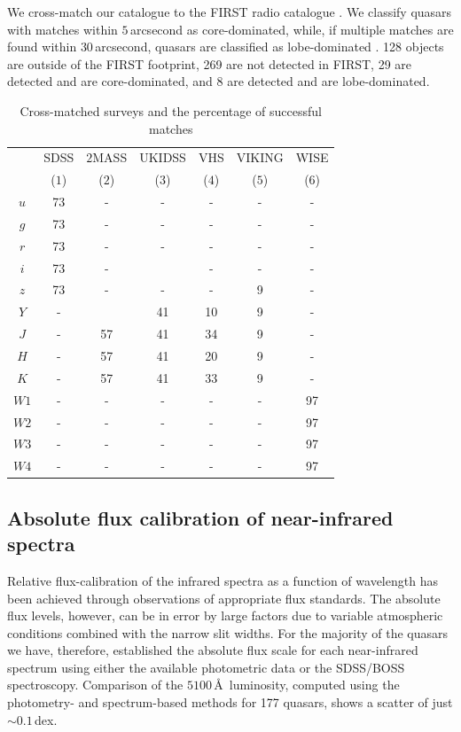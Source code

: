 We cross-match our catalogue to the FIRST radio catalogue \citep{white97}. 
We classify quasars with matches within $5$\,arcsecond as core-dominated, while, if multiple matches are found within $30$\,arcsecond, quasars are classified as lobe-dominated \citep[e.g.][]{shen11}. 
128 objects are outside of the FIRST footprint, 269 are not detected in FIRST, 29 are detected and are core-dominated, and 8 are detected and are lobe-dominated. 

\begin{table}
  \centering
  \footnotesize 
  \caption{Cross-matched surveys and the percentage of successful matches}
  \label{tab:cross-matching}
    \begin{tabular}{ccccccc} 
    \hline
     & SDSS & $2$MASS & UKIDSS & VHS & VIKING & WISE \\
     & ($1$) & ($2$) & ($3$) & ($4$) & ($5$) & ($6$) \\ 
    \hline
    $u$ & 73 & - & - & - & - & - \\
    $g$ & 73 & - & - & - & - & - \\
    $r$ & 73 & - & - & - & - & - \\
    $i$ & 73 & - &  & - & - & - \\
    $z$ & 73 & - & - & - & 9 & - \\
    $Y$ & - &  & 41 & 10 & 9 & - \\
    $J$ & - & 57 & 41 & 34 & 9 & - \\
    $H$ & - & 57 & 41 & 20 & 9 & - \\
    $K$ & - & 57 & 41 & 33 & 9 & - \\
    $W1$ & - & - & - & - & - & 97 \\
    $W2$ & - & - & - & - & - & 97 \\
    $W3$ & - & - & - & - & - & 97 \\
    $W4$ & - & - & - & - & - & 97 \\
    \hline
    \end{tabular}
\end{table} 

\subsection{Absolute flux calibration of near-infrared spectra}

Relative flux-calibration of the infrared spectra as a function of wavelength has been achieved through observations of appropriate flux standards. 
The absolute flux levels, however, can be in error by large factors due to variable atmospheric conditions combined with the narrow slit widths. 
For the majority of the quasars we have, therefore, established the absolute flux scale for each near-infrared spectrum using either the available photometric data or the SDSS/BOSS spectroscopy.
Comparison of the $5100$\,\AA\, luminosity, computed using the photometry- and spectrum-based methods for 177 quasars, shows a scatter of just $\sim0.1$\,dex.

